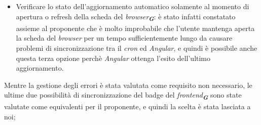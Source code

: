 \begin{itemize}
\begin{itemize}
            \item Verificare lo stato dell'aggiornamento automatico solamente al momento di apertura o refresh della scheda del \emph{browser}\textsubscript{\textbf{\textit{G}}}: è stato infatti constatato assieme al proponente che è molto improbabile che l'utente mantenga aperta la scheda del \emph{browser} per un tempo sufficientemente lungo da causare problemi di sincronizzazione tra il \emph{cron} ed \emph{Angular}, e quindi è possibile anche questa terza opzione perchè \emph{Angular} ottenga l'esito dell'ultimo aggiornamento.
        \end{itemize} 
    Mentre la gestione degli errori è stata valutata come requisito non necessario, le ultime due possibilità di sincronizzazione del badge del \emph{frontend}\textsubscript{\textbf{\textit{G}}} sono state valutate come equivalenti per il proponente, e quindi la scelta è stata lasciata a noi;


\end{itemize}
